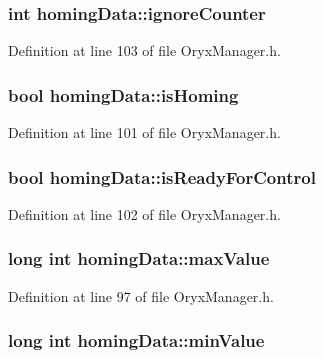 \subsubsection[{ignore\-Counter}]{\setlength{\rightskip}{0pt plus 5cm}int {\bf homing\-Data\-::ignore\-Counter}}\label{structhomingData_a2cd810c386479bda6f9c0589b18fffb6}


\-Definition at line 103 of file \-Oryx\-Manager.\-h.

\subsubsection[{is\-Homing}]{\setlength{\rightskip}{0pt plus 5cm}bool {\bf homing\-Data\-::is\-Homing}}\label{structhomingData_acd48e5048eff3ace2105fbeb0ac75078}


\-Definition at line 101 of file \-Oryx\-Manager.\-h.

\subsubsection[{is\-Ready\-For\-Control}]{\setlength{\rightskip}{0pt plus 5cm}bool {\bf homing\-Data\-::is\-Ready\-For\-Control}}\label{structhomingData_a9b24d88a2d58319aa1b1b99f4bbb0998}


\-Definition at line 102 of file \-Oryx\-Manager.\-h.

\subsubsection[{max\-Value}]{\setlength{\rightskip}{0pt plus 5cm}long int {\bf homing\-Data\-::max\-Value}}\label{structhomingData_a729ace6673efb71b0d6d847e3f9b9ccc}


\-Definition at line 97 of file \-Oryx\-Manager.\-h.

\subsubsection[{min\-Value}]{\setlength{\rightskip}{0pt plus 5cm}long int {\bf homing\-Data\-::min\-Value}}\label{structhomingData_ae484e40a7045474e7d3ac1b40a639980}


